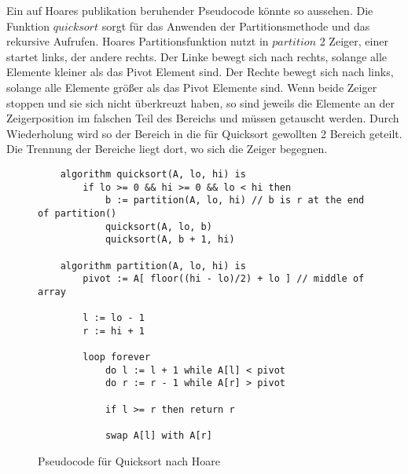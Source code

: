 \clearpage

Ein auf Hoares publikation beruhender Pseudocode könnte so aussehen.
Die Funktion $quicksort$ sorgt für das Anwenden der Partitionsmethode und das rekursive
Aufrufen. Hoares Partitionsfunktion nutzt in $partition$ 2 Zeiger, einer startet links,
der andere rechts. Der Linke bewegt sich nach rechts, solange alle Elemente kleiner
als das Pivot Element sind. Der Rechte bewegt sich nach links, solange alle Elemente
größer als das Pivot Elemente sind. Wenn beide Zeiger stoppen und sie sich nicht überkreuzt
haben, so sind jeweils die Elemente an der Zeigerposition im falschen Teil des Bereichs und
müssen getauscht werden. Durch Wiederholung wird so der Bereich in die für Quicksort gewollten
2 Bereich geteilt. Die Trennung der Bereiche liegt dort, wo sich die Zeiger begegnen.

\begin{figure}[H]
    \begin{lstlisting}
    algorithm quicksort(A, lo, hi) is 
        if lo >= 0 && hi >= 0 && lo < hi then
            b := partition(A, lo, hi) // b is r at the end of partition()
            quicksort(A, lo, b)
            quicksort(A, b + 1, hi) 
    
    algorithm partition(A, lo, hi) is 
        pivot := A[ floor((hi - lo)/2) + lo ] // middle of array
    
        l := lo - 1
        r := hi + 1
    
        loop forever 
            do l := l + 1 while A[l] < pivot
            do r := r - 1 while A[r] > pivot
    
            if l >= r then return r
    
            swap A[l] with A[r]
    \end{lstlisting}
    \caption{Pseudocode für Quicksort nach Hoare}
\end{figure}


